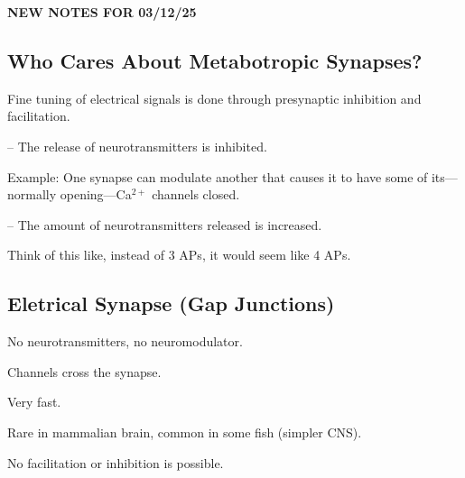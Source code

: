 \begin{center}
    \textbf{NEW NOTES FOR 03/12/25} \\
    \hrulefill
\end{center}

\subsection{Who Cares About Metabotropic Synapses?}

\begin{coloredlist}
    \item Fine tuning of electrical signals is done through presynaptic inhibition and facilitation.
    \begin{coloredlist}
        \item {} -- The release of neurotransmitters is inhibited. 
    \begin{coloredlist}
        \item Example: One synapse can modulate another that causes it to have some of its---normally opening---Ca\(^{2+}\) channels closed.
        \end{coloredlist}
        \item {} -- The amount of neurotransmitters released is increased. 
        \begin{coloredlist}
            \item Think of this like, instead of 3 APs, it would seem like 4 APs.
        \end{coloredlist}
    \end{coloredlist}
\end{coloredlist}

\subsection{Eletrical Synapse (Gap Junctions)}

\begin{coloredlist}
    \item No neurotransmitters, no neuromodulator.
    \item Channels cross the synapse.
    \item Very fast.
    \item Rare in mammalian brain, common in some fish (simpler CNS).
    \item No facilitation or inhibition is possible.
\end{coloredlist}

